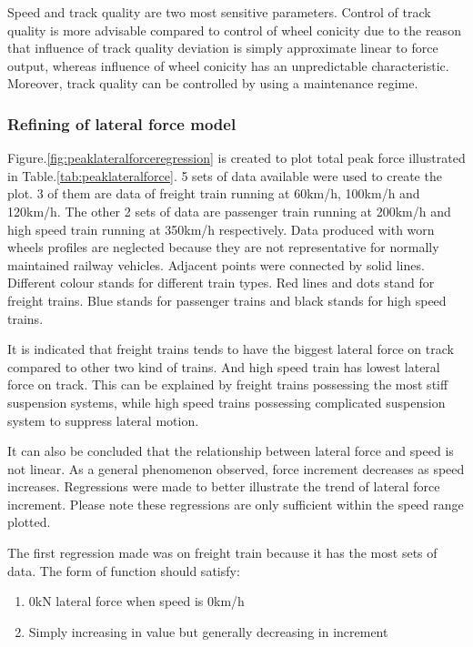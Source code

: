 Speed and track quality are two most sensitive parameters. Control of track quality is more advisable compared to control of wheel conicity due to the reason that influence of track quality deviation is simply approximate linear to force output, whereas influence of wheel conicity has an unpredictable characteristic. Moreover, track quality can be controlled by using a maintenance regime.

\subsubsection{Refining of lateral force model}

Figure.\ref{fig:peaklateralforceregression} is created to plot total peak force illustrated in Table.\ref{tab:peaklateralforce}. 5 sets of data available were used to create the plot. 3 of them are data of freight train running at 60km/h, 100km/h and 120km/h. The other 2 sets of data are passenger train running at 200km/h and high speed train running at 350km/h respectively. Data produced with worn wheels profiles are neglected because they are not representative for normally maintained railway vehicles. Adjacent points were connected by solid lines. Different colour stands for different train types. Red lines and dots stand for freight trains. Blue stands for passenger trains and black stands for high speed trains. 

It is indicated that freight trains tends to have the biggest lateral force on track compared to other two kind of trains. And high speed train has lowest lateral force on track. This can be explained by freight trains possessing the most stiff suspension systems, while high speed trains possessing complicated suspension system to suppress lateral motion.

It can also be concluded that the relationship between lateral force and speed is not linear. As a general phenomenon observed, force increment decreases as speed increases. Regressions were made to better illustrate the trend of lateral force increment. Please note these regressions are only sufficient within the speed range plotted.

The first regression made was on freight train because it has the most sets of data. The form of function should satisfy:

\begin{enumerate}  
    \item 0kN lateral force when speed is 0km/h
    \item Simply increasing in value but generally decreasing in increment
\end{enumerate}

